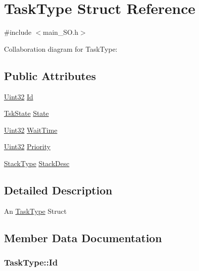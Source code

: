 \hypertarget{struct_task_type}{}\section{Task\+Type Struct Reference}
\label{struct_task_type}


{\ttfamily \#include $<$main\+\_\+\+S\+O.\+h$>$}



Collaboration diagram for Task\+Type\+:
\subsection*{Public Attributes}
\begin{DoxyCompactItemize}
\item 
\hyperlink{_d_s_p2833x___device_8h_aba99025e657f892beb7ff31cecf64653}{Uint32} \hyperlink{struct_task_type_a5c8346dfb3c30a5c8dcab6d67f6798ae}{Id}
\item 
\hyperlink{main___s_o_8h_abe407100583d09822819bb0a5912c754}{Tsk\+State} \hyperlink{struct_task_type_a2a676961a53f017e2e12b3524fab55f8}{State}
\item 
\hyperlink{_d_s_p2833x___device_8h_aba99025e657f892beb7ff31cecf64653}{Uint32} \hyperlink{struct_task_type_adce0490006866406e48613c39eeafcad}{Wait\+Time}
\item 
\hyperlink{_d_s_p2833x___device_8h_aba99025e657f892beb7ff31cecf64653}{Uint32} \hyperlink{struct_task_type_a927eb587d1084573c154ad3e657b3bd2}{Priority}
\item 
\hyperlink{struct_stack_type}{Stack\+Type} \hyperlink{struct_task_type_a448011a1fe908f2ce2a27ce40e13bfbb}{Stack\+Desc}
\end{DoxyCompactItemize}


\subsection{Detailed Description}
An \hyperlink{struct_task_type}{Task\+Type} Struct 

\subsection{Member Data Documentation}
\hypertarget{struct_task_type_a5c8346dfb3c30a5c8dcab6d67f6798ae}{}
\subsubsection[{Id}]{ Task\+Type\+::\+Id}\label{struct_task_type_a5c8346dfb3c30a5c8dcab6d67f6798ae}
\hypertarget{struct_task_type_a927eb587d1084573c154ad3e657b3bd2}{}
